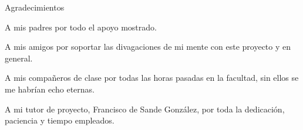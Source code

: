 %
%
%
%

\thispagestyle{empty}

{\flushright

	\begin{LARGE}
		Agradecimientos
	\end{LARGE}

	\hspace{3mm}

	\begin{large}

		\hspace{3mm}
		A mis padres por todo el apoyo mostrado.
	
		\hspace{3mm}
		A mis amigos por soportar las divagaciones de mi mente con este proyecto y en general.
	
		\hspace{3mm}
		A mis compañeros de clase por todas las horas pasadas en la facultad, sin ellos se me habrían echo eternas.
	
		\hspace{3mm}
		A mi tutor de proyecto, Francisco de Sande González, por toda la dedicación, paciencia y tiempo empleados.

	\end{large}

}